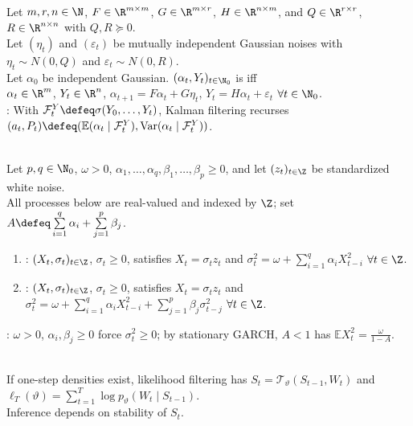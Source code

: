 \begin{definition} \label{def:state-space-model-kalman} \\
Let $m,r,n\in\N$, $F\in\R^{m\times m}$, $G\in\R^{m\times r}$, $H\in\R^{n\times m}$, and $Q\in\R^{r\times r}$, $R\in\R^{n\times n}$ with $Q,R\succeq0$.\\
Let $(\eta_t)$ and $(\varepsilon_t)$ be mutually independent Gaussian noises with $\eta_t\sim N(0,Q)$ and $\varepsilon_t\sim N(0,R)$.\\
Let $\alpha_0$ be independent Gaussian. $(\alpha_t,Y_t)_{t\in\N_0}$ is  iff\\
$\alpha_t\in\R^m$, $Y_t\in\R^n$, $\alpha_{t+1}=F\alpha_t+G\eta_t$, $Y_t=H\alpha_t+\varepsilon_t$ $\forall t\in\N_0$.\\
: With $\mathcal{F}_t^Y\defeq\sigma(Y_0,\ldots,Y_t)$, Kalman filtering recurses $(a_t,P_t)\defeq(\mathbb{E}(\alpha_t\mid\mathcal{F}_t^Y),\operatorname{Var}(\alpha_t\mid\mathcal{F}_t^Y))$.
\end{definition}

\begin{definition} \label{def:arch-garch-models} \\
Let $p,q\in\N_0$, $\omega>0$, $\alpha_1,\ldots,\alpha_q,\beta_1,\ldots,\beta_p\geq0$, and let $(z_t)_{t\in\Z}$ be standardized white noise.\\
All processes below are real-valued and indexed by $\Z$; set $A\defeq\sum\limits_{i=1}^{q}\alpha_i+\sum\limits_{j=1}^{p}\beta_j$.
\begin{enumerate}[label=(\roman*)]
\setlength{\itemsep}{0pt}
\item {}: $(X_t,\sigma_t)_{t\in\Z}$, $\sigma_t\geq0$, satisfies $X_t=\sigma_t z_t$ and $\sigma_t^2=\omega+\sum\limits_{i=1}^{q}\alpha_iX_{t-i}^2$ $\forall t\in\Z$.
\item {}: $(X_t,\sigma_t)_{t\in\Z}$, $\sigma_t\geq0$, satisfies $X_t=\sigma_t z_t$ and $\sigma_t^2=\omega+\sum_{i=1}^{q}\alpha_iX_{t-i}^2+\sum\limits_{j=1}^{p}\beta_j\sigma_{t-j}^2$ $\forall t\in\Z$.
\end{enumerate}
: $\omega>0$, $\alpha_i,\beta_j\geq0$ force $\sigma_t^2\geq0$; by stationary GARCH, $A<1$ has $\mathbb{E}X_t^2=\frac{\omega}{1-A}$.
\end{definition}

\begin{remark} \label{rem:time-series-likelihood-filtering} \\
If one-step densities exist, likelihood filtering has $S_t=\mathcal{T}_\vartheta(S_{t-1},W_t)$ and $\ell_T(\vartheta)=\sum\limits_{t=1}^{T}\log p_\vartheta(W_t\mid S_{t-1})$.\\
Inference depends on stability of $S_t$.
\end{remark}

